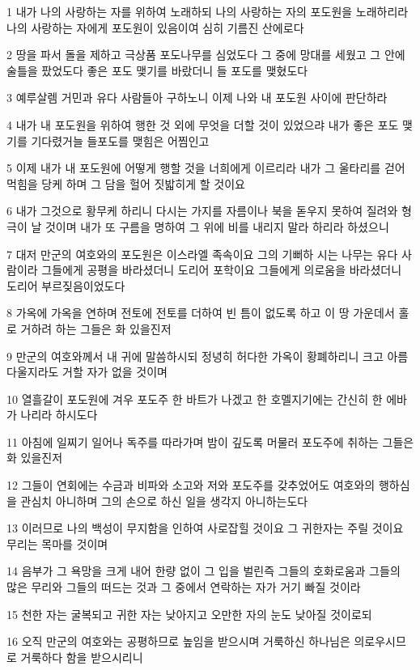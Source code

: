 \par 1 내가 나의 사랑하는 자를 위하여 노래하되 나의 사랑하는 자의 포도원을 노래하리라 나의 사랑하는 자에게 포도원이 있음이여 심히 기름진 산에로다
\par 2 땅을 파서 돌을 제하고 극상품 포도나무를 심었도다 그 중에 망대를 세웠고 그 안에 술틀을 팠었도다 좋은 포도 맺기를 바랐더니 들 포도를 맺혔도다
\par 3 예루살렘 거민과 유다 사람들아 구하노니 이제 나와 내 포도원 사이에 판단하라
\par 4 내가 내 포도원을 위하여 행한 것 외에 무엇을 더할 것이 있었으랴 내가 좋은 포도 맺기를 기다렸거늘 들포도를 맺힘은 어찜인고
\par 5 이제 내가 내 포도원에 어떻게 행할 것을 너희에게 이르리라 내가 그 울타리를 걷어 먹힘을 당케 하며 그 담을 헐어 짓밟히게 할 것이요
\par 6 내가 그것으로 황무케 하리니 다시는 가지를 자름이나 북을 돋우지 못하여 질려와 형극이 날 것이며 내가 또 구름을 명하여 그 위에 비를 내리지 말라 하리라 하셨으니
\par 7 대저 만군의 여호와의 포도원은 이스라엘 족속이요 그의 기뻐하 시는 나무는 유다 사람이라 그들에게 공평을 바라셨더니 도리어 포학이요 그들에게 의로움을 바라셨더니 도리어 부르짖음이었도다
\par 8 가옥에 가옥을 연하며 전토에 전토를 더하여 빈 틈이 없도록 하고 이 땅 가운데서 홀로 거하려 하는 그들은 화 있을진저
\par 9 만군의 여호와께서 내 귀에 말씀하시되 정녕히 허다한 가옥이 황폐하리니 크고 아름다울지라도 거할 자가 없을 것이며
\par 10 열흘갈이 포도원에 겨우 포도주 한 바트가 나겠고 한 호멜지기에는 간신히 한 에바가 나리라 하시도다
\par 11 아침에 일찌기 일어나 독주를 따라가며 밤이 깊도록 머물러 포도주에 취하는 그들은 화 있을진저
\par 12 그들이 연회에는 수금과 비파와 소고와 저와 포도주를 갖추었어도 여호와의 행하심을 관심치 아니하며 그의 손으로 하신 일을 생각지 아니하는도다
\par 13 이러므로 나의 백성이 무지함을 인하여 사로잡힐 것이요 그 귀한자는 주릴 것이요 무리는 목마를 것이며
\par 14 음부가 그 욕망을 크게 내어 한량 없이 그 입을 벌린즉 그들의 호화로움과 그들의 많은 무리와 그들의 떠드는 것과 그 중에서 연락하는 자가 거기 빠질 것이라
\par 15 천한 자는 굴복되고 귀한 자는 낮아지고 오만한 자의 눈도 낮아질 것이로되
\par 16 오직 만군의 여호와는 공평하므로 높임을 받으시며 거룩하신 하나님은 의로우시므로 거룩하다 함을 받으시리니
